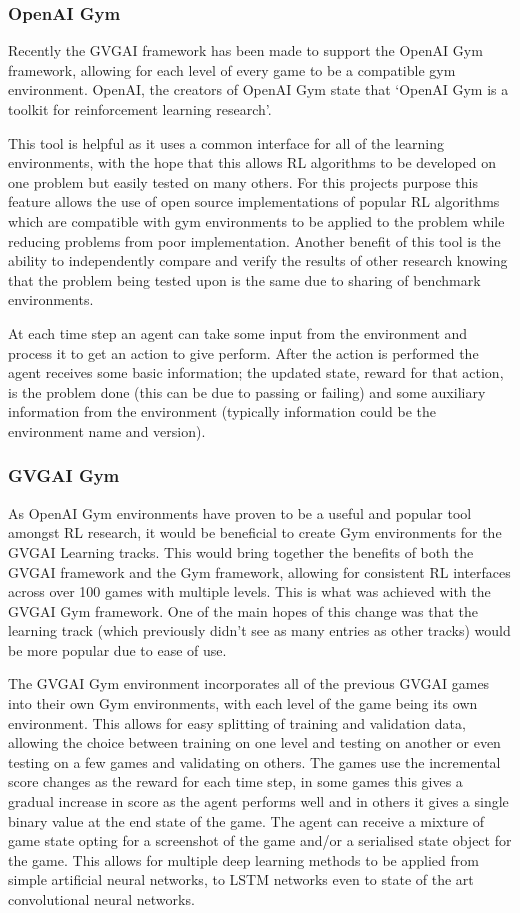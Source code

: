 \documentclass[a4paper]{article}
\begin{document}
\subsubsection{OpenAI Gym}
Recently the GVGAI framework has been made to support the OpenAI Gym framework, allowing for each level of every game to be a compatible gym environment.
OpenAI, the creators of OpenAI Gym state that `OpenAI Gym is a toolkit for reinforcement learning research'\cite{OpenAIGym}.
\par
This tool is helpful as it uses a common interface for all of the learning environments, with the hope that this allows RL algorithms to be developed on one problem but easily tested on many others.
For this projects purpose this feature allows the use of open source implementations of popular RL algorithms which are compatible with gym environments to be applied to the problem while reducing problems from poor implementation.
Another benefit of this tool is the ability to independently compare and verify the results of other research knowing that the problem being tested upon is the same due to sharing of benchmark environments.
\par
At each time step an agent can take some input from the environment and process it to get an action to give perform.
After the action is performed the agent receives some basic information; the updated state, reward for that action, is the problem done (this can be due to passing or failing) and some auxiliary information from the environment (typically information could be the environment name and version).
\subsubsection{GVGAI Gym}
As OpenAI Gym environments have proven to be a useful and popular tool amongst RL research, it would be beneficial to create Gym environments for the GVGAI Learning tracks.
This would bring together the benefits of both the GVGAI framework and the Gym framework, allowing for consistent RL interfaces across over 100 games with multiple levels.
This is what was achieved with the GVGAI Gym framework\cite{GVGAIGYM}.
One of the main hopes of this change was that the learning track (which previously didn't see as many entries as other tracks) would be more popular due to ease of use.
\par
The GVGAI Gym environment incorporates all of the previous GVGAI games into their own Gym environments, with each level of the game being its own environment.
This allows for easy splitting of training and validation data, allowing the choice between training on one level and testing on another or even testing on a few games and validating on others.
The games use the incremental score changes as the reward for each time step, in some games this gives a gradual increase in score as the agent performs well and in others it gives a single binary value at the end state of the game.
The agent can receive a mixture of game state opting for a screenshot of the game and/or a serialised state object for the game.
This allows for multiple deep learning methods to be applied from simple artificial neural networks, to LSTM networks even to state of the art convolutional neural networks.
\end{document}
